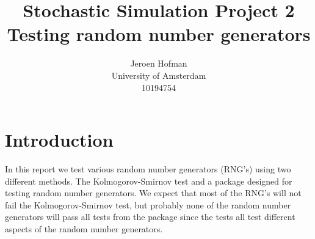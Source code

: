 \documentclass[10pt,a4paper]{article}
\begin{document}
\captionsetup{width=0.8\textwidth}

\author{Jeroen Hofman\\
  University of Amsterdam \\
  		10194754\\
		}
\title{Stochastic Simulation Project 2\\
       Testing random number generators
		}
\maketitle

\newpage

\section{Introduction}
In this report we test various random number generators (RNG's) using two different methods. The Kolmogorov-Smirnov test and a package designed for testing random number generators. We expect that most of the RNG's will not fail the Kolmogorov-Smirnov test, but probably none of the random number generators will pass all tests from the package since the tests all test different aspects of the random number generators.
\end{document}
